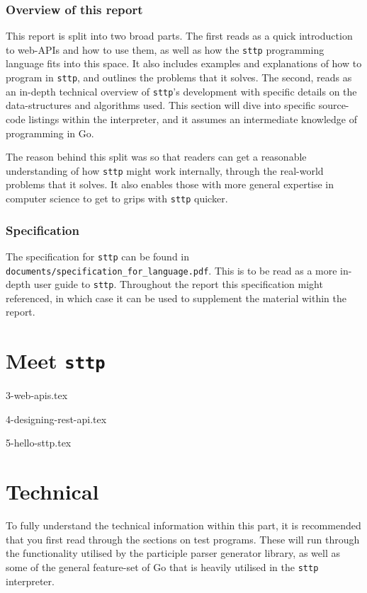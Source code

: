 \documentclass[]{full}
\theoremstyle{definition}
\begin{document}
\section{Overview of this report}

This report is split into two broad parts. The first reads as a quick introduction to web-APIs and how to use them, as well as how the \verb|sttp| programming language fits into this space. It also includes examples and explanations of how to program in \verb|sttp|, and outlines the problems that it solves. The second, reads as an in-depth technical overview of \verb|sttp|'s development with specific details on the data-structures and algorithms used. This section will dive into specific source-code listings within the interpreter, and it assumes an intermediate knowledge of programming in Go.

The reason behind this split was so that readers can get a reasonable understanding of how \verb|sttp| might work internally, through the real-world problems that it solves. It also enables those with more general expertise in computer science to get to grips with \verb|sttp| quicker.

\section{Specification}

The specification for \verb|sttp| can be found in \verb|documents/specification_for_language.pdf|. This is to be read as a more in-depth user guide to \verb|sttp|. Throughout the report this specification might referenced, in which case it can be used to supplement the material within the report.

\cprotect\part{Meet \verb|sttp|}

{3-web-apis.tex}

{4-designing-rest-api.tex}

{5-hello-sttp.tex}

\part{Technical}

To fully understand the technical information within this part, it is recommended that you first read through the sections on test programs. These will run through the functionality utilised by the participle parser generator library, as well as some of the general feature-set of Go that is heavily utilised in the \verb|sttp| interpreter.
\end{document}
